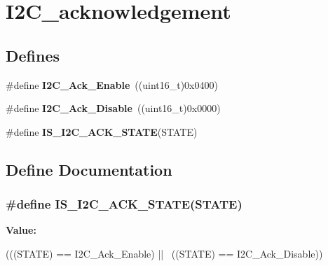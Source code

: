 \hypertarget{group__I2C__acknowledgement}{
\section{I2C\_\-acknowledgement}
\label{group__I2C__acknowledgement}
}
\subsection*{Defines}
\begin{DoxyCompactItemize}
\item 
\hypertarget{group__I2C__acknowledgement_ga616466f8ef5a47237cdbf7ac578ec507}{
\#define {\bfseries I2C\_\-Ack\_\-Enable}~((uint16\_\-t)0x0400)}
\label{group__I2C__acknowledgement_ga616466f8ef5a47237cdbf7ac578ec507}

\item 
\hypertarget{group__I2C__acknowledgement_gadb5f47c052ac6bae1aa58c724e339e36}{
\#define {\bfseries I2C\_\-Ack\_\-Disable}~((uint16\_\-t)0x0000)}
\label{group__I2C__acknowledgement_gadb5f47c052ac6bae1aa58c724e339e36}

\item 
\#define {\bfseries IS\_\-I2C\_\-ACK\_\-STATE}(STATE)
\end{DoxyCompactItemize}


\subsection{Define Documentation}
\hypertarget{group__I2C__acknowledgement_ga6401bedc842e784a2bb78b3aa21af19d}{
\subsubsection[{IS\_\-I2C\_\-ACK\_\-STATE}]{\setlength{\rightskip}{0pt plus 5cm}\#define IS\_\-I2C\_\-ACK\_\-STATE(STATE)}}
\label{group__I2C__acknowledgement_ga6401bedc842e784a2bb78b3aa21af19d}
{\bfseries Value:}
\begin{DoxyCode}
(((STATE) == I2C_Ack_Enable) || \
                                 ((STATE) == I2C_Ack_Disable))
\end{DoxyCode}
